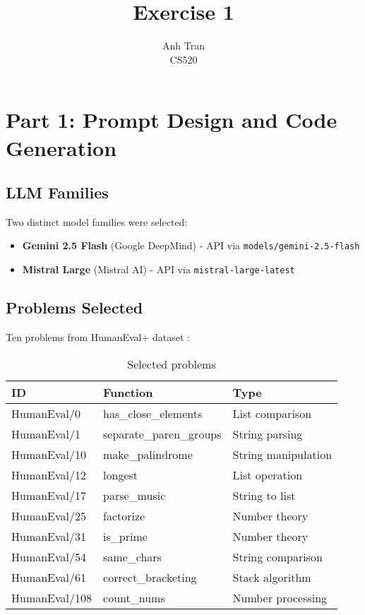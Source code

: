 \documentclass[11pt]{article}
\title{Exercise 1}
\author{Anh Tran \\ CS520}
\begin{document}
\maketitle

\section{Part 1: Prompt Design and Code Generation}

\subsection{LLM Families}

Two distinct model families were selected:

\begin{itemize}
    \item \textbf{Gemini 2.5 Flash} (Google DeepMind) - API via \texttt{models/gemini-2.5-flash}
    \item \textbf{Mistral Large} (Mistral AI) - API via \texttt{mistral-large-latest}
\end{itemize}

\subsection{Problems Selected}

Ten problems from HumanEval+ dataset \cite{humanevalplus}:

\begin{table}[h]
\centering
\small
\begin{tabular}{lll}
\toprule
\textbf{ID} & \textbf{Function} & \textbf{Type} \\
\midrule
HumanEval/0 & has\_close\_elements & List comparison \\
HumanEval/1 & separate\_paren\_groups & String parsing \\
HumanEval/10 & make\_palindrome & String manipulation \\
HumanEval/12 & longest & List operation \\
HumanEval/17 & parse\_music & String to list \\
HumanEval/25 & factorize & Number theory \\
HumanEval/31 & is\_prime & Number theory \\
HumanEval/54 & same\_chars & String comparison \\
HumanEval/61 & correct\_bracketing & Stack algorithm \\
HumanEval/108 & count\_nums & Number processing \\
\bottomrule
\end{tabular}
\caption{Selected problems}
\end{table}
\end{document}
